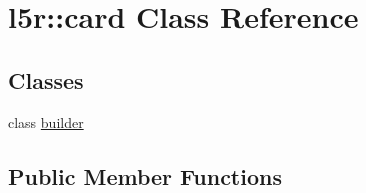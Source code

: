 \hypertarget{classl5r_1_1card}{}\section{l5r\+:\+:card Class Reference}
\label{classl5r_1_1card}
\subsection*{Classes}
\begin{DoxyCompactItemize}
\item 
class \hyperlink{classl5r_1_1card_1_1builder}{builder}
\end{DoxyCompactItemize}
\subsection*{Public Member Functions}
